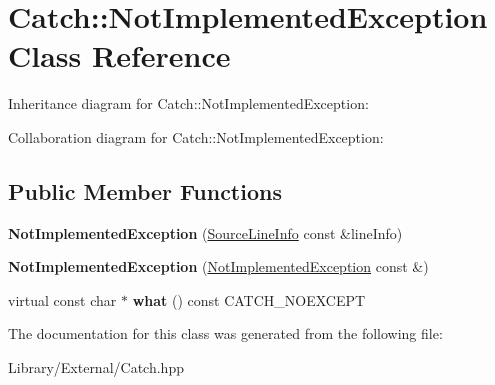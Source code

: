 \hypertarget{class_catch_1_1_not_implemented_exception}{}\section{Catch\+:\+:Not\+Implemented\+Exception Class Reference}
\label{class_catch_1_1_not_implemented_exception}


Inheritance diagram for Catch\+:\+:Not\+Implemented\+Exception\+:


Collaboration diagram for Catch\+:\+:Not\+Implemented\+Exception\+:
\subsection*{Public Member Functions}
\begin{DoxyCompactItemize}
\item 
\hypertarget{class_catch_1_1_not_implemented_exception_ab4f0a5c39d8ffb72c664e2c07e180634}{}{\bfseries Not\+Implemented\+Exception} (\hyperlink{struct_catch_1_1_source_line_info}{Source\+Line\+Info} const \&line\+Info)\label{class_catch_1_1_not_implemented_exception_ab4f0a5c39d8ffb72c664e2c07e180634}

\item 
\hypertarget{class_catch_1_1_not_implemented_exception_a508a7a833455da2d3c10ea1a9d45e982}{}{\bfseries Not\+Implemented\+Exception} (\hyperlink{class_catch_1_1_not_implemented_exception}{Not\+Implemented\+Exception} const \&)\label{class_catch_1_1_not_implemented_exception_a508a7a833455da2d3c10ea1a9d45e982}

\item 
\hypertarget{class_catch_1_1_not_implemented_exception_ad4c13963f1a8feacda0cd331adda89e3}{}virtual const char $\ast$ {\bfseries what} () const C\+A\+T\+C\+H\+\_\+\+N\+O\+E\+X\+C\+E\+P\+T\label{class_catch_1_1_not_implemented_exception_ad4c13963f1a8feacda0cd331adda89e3}

\end{DoxyCompactItemize}


The documentation for this class was generated from the following file\+:\begin{DoxyCompactItemize}
\item 
Library/\+External/Catch.\+hpp\end{DoxyCompactItemize}
